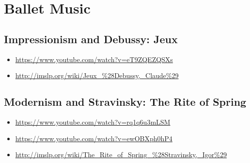 
\chapter{Ballet Music}
\label{balletmusic}


\section{Impressionism and Debussy: Jeux}
\begin{itemize}
\item \url{https://www.youtube.com/watch?v=eT9ZQEZQSXs}
\item \url{http://imslp.org/wiki/Jeux_%28Debussy,_Claude%29}
\end{itemize}


\section{Modernism and Stravinsky: The Rite of Spring}
\begin{itemize}
\item \url{https://www.youtube.com/watch?v=rq1q6u3mLSM}
\item \url{https://www.youtube.com/watch?v=ewOBXph0hP4}
\item \url{http://imslp.org/wiki/The_Rite_of_Spring_%28Stravinsky,_Igor%29}
\end{itemize}


